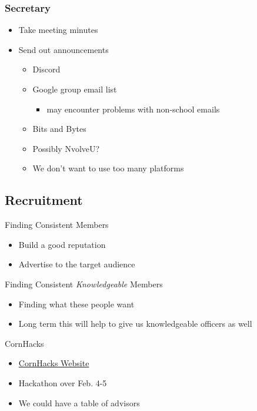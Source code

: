     \subsubsection{Secretary}
        \begin{itemize}
            \item Take meeting minutes
            \item Send out announcements
            \begin{itemize}
                \item Discord
                \item Google group email list
                \begin{itemize}
                    \item may encounter problems with non-school emails
                \end{itemize}
                \item Bits and Bytes
                \item Possibly NvolveU?
                \item We don't want to use too many platforms
            \end{itemize}
            
        \end{itemize}

\subsection{Recruitment}
Finding Consistent Members
    \begin{itemize}
        \item Build a good reputation
        \item Advertise to the target audience
    \end{itemize}
Finding Consistent \emph{Knowledgeable} Members
    \begin{itemize}
        \item Finding what these people want
        \item Long term this will help to give us knowledgeable officers as well
    \end{itemize}
CornHacks
    \begin{itemize}
        \item \href{https://unlcornhacks.com/#/home}{CornHacks Website}
        \item Hackathon over Feb. 4-5
        \item We could have a table of advisors
    \end{itemize}


